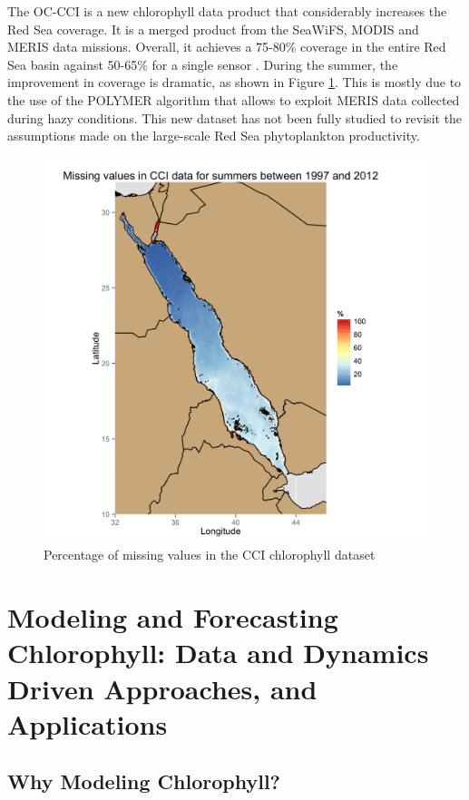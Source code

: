 The OC-CCI is a new chlorophyll data product that considerably increases the
Red Sea coverage. It is a merged product from the SeaWiFS, MODIS and MERIS data
missions.  Overall, it achieves a 75-80\% coverage in the entire Red Sea basin
against 50-65\% for a single sensor \citep{Racault}. During the summer, the
improvement in coverage is dramatic, as shown in Figure \ref{misval_cci}.
This is mostly
due to the use of the POLYMER algorithm \citep{Steinmetz2011} that allows to
exploit MERIS data collected during hazy conditions. This new dataset
has not been fully studied to revisit the assumptions made on the large-scale
Red Sea phytoplankton productivity.

\begin{figure}[h]
    \centering
    \includegraphics[scale=.15]{figures/cci_missing_values_summer.png}
    \caption{Percentage of missing values in the CCI chlorophyll dataset}
    \label{misval_cci}
\end{figure}

\section{Modeling and Forecasting Chlorophyll: Data and Dynamics Driven
Approaches, and Applications}

\subsection{Why Modeling Chlorophyll?}

